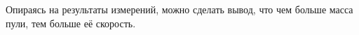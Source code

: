 Опираясь на результаты измерений, можно сделать вывод, что чем больше масса пули, тем больше её скорость.
